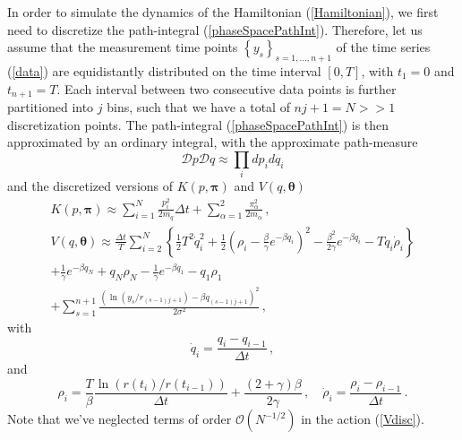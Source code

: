 \documentclass[12pt,a4paper,final]{iopart}
\newcommand{\bt}{\pmb\theta}
\begin{document}
In order to simulate the dynamics of the Hamiltonian (\ref{Hamiltonian}), we first need to discretize the path-integral (\ref{phaseSpacePathInt}).
Therefore, let us assume that the measurement time points $\left\{ y_s \right\}_{s=1,\dots, n+1}$ of the time series (\ref{data}) are equidistantly distributed on the time interval $[0,T]$, with $t_1=0$ and $t_{n+1}=T$.
Each interval between two consecutive data points is further partitioned into $j$ bins, such that we have a total of $nj+1=N>>1$ discretization points.
The path-integral (\ref{phaseSpacePathInt}) is then approximated by an ordinary integral, with the approximate path-measure
\begin{equation}
  \mathcal Dp\mathcal Dq
  \approx
  \prod_i dp_i dq_i
\end{equation}
and the discretized versions of $K( p,{\pmb\pi})$ and $V( q,\bt)$
\begin{eqnarray}
   K( p,{\pmb\pi}) \approx
   \sum_{i=1}^N
   \frac{ p_i^2}{2m_q}\Delta t
   +
   \sum_{\alpha=1}^2\frac{\pi_\alpha^2}{2m_\alpha}\,,\label{Kdisc}
   \\
   V(q,\bt) \approx \frac{\Delta t}{T} \sum_{i=2}^{N}
   \left\{ \frac{1}{2} T^2 \dot q_i^2 + \frac{1}{2}
     \left( \rho_i-\frac{\beta}{\gamma}e^{-\beta q_i} \right)^2 -
    \frac{\beta^2}{2\gamma} e^{-\beta q_i} - T q_i\dot\rho_i \right\}  \nonumber
  \\
  +
  \frac{1}{\gamma}
  e^{-\beta q_N}
  +
  q_N \rho_{N}
  -
  \frac{1}{\gamma}
  e^{-\beta q_1}
  -
  q_1 \rho_{1}
  \nonumber
  \\
  +
  \sum_{s=1}^{n+1}
  \frac{(\ln(y_s/r_{(s-1)j+1}) - {\beta q_{(s-1)j+1}})^2}{2\sigma^2}
  \label{Vdisc}
   \,,
\end{eqnarray}
with
\begin{equation}
  \dot q_i = \frac{q_i-q_{i-1}}{\Delta t}\,,
\end{equation}
and
\begin{equation}\label{rhodisc}
\rho_i = \frac{T}{\beta} \frac{\ln(r(t_{i})/r(t_{i-1}))}{\Delta t}
+
\frac{(2+\gamma)\beta}{2\gamma}
\,,\quad
\dot\rho_i = \frac{\rho_i-\rho_{i-1}}{\Delta t}\,.
\end{equation}
Note that we've neglected terms of order $\mathcal O(N^{-1/2})$ in the action (\ref{Vdisc}).
\end{document}
